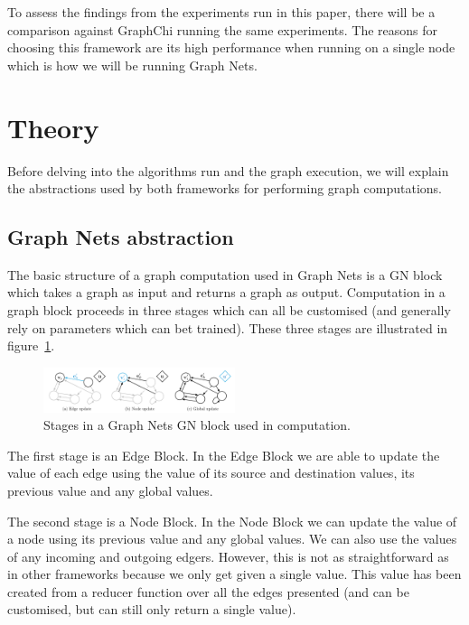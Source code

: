 \documentclass[sigconf,nonacm]{acmart}
\begin{document}
To assess the findings from the experiments run in this paper, there will be a comparison against GraphChi\cite{graphchi} running the same experiments. The reasons for choosing this framework are its high performance when running on a single node which is how we will be running Graph Nets.

\section{Theory}

Before delving into the algorithms run and the graph execution, we will explain the abstractions used by both frameworks for performing graph computations.

\subsection{Graph Nets abstraction}\label{section:abstraction}

The basic structure of a graph computation used in Graph Nets is a GN block which takes a graph as input and returns a graph as output. Computation in a graph block proceeds in three stages which can all be customised (and generally rely on parameters which can bet trained). These three stages are illustrated in figure~\ref{fig:graph-nets-stages}.

\begin{figure}[H]
    \centering
    \includegraphics[width=0.5\textwidth]{graph-nets-stages.png}
    \caption{Stages in a Graph Nets GN block used in computation.}
    \label{fig:graph-nets-stages}
\end{figure}

The first stage is an Edge Block. In the Edge Block we are able to update the value of each edge using the value of its source and destination values, its previous value and any global values.

The second stage is a Node Block. In the Node Block we can update the value of a node using its previous value and any global values. We can also use the values of any incoming and outgoing edgers. However, this is not as straightforward as in other frameworks because we only get given a single value. This value has been created from a reducer function over all the edges presented (and can be customised, but can still only return a single value).
\end{document}
